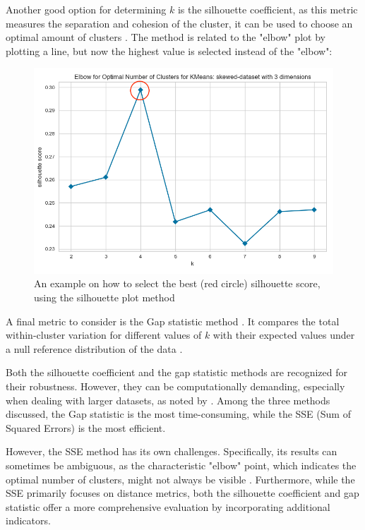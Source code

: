 Another good option for determining $k$ is the silhouette coefficient, as this metric measures the separation and cohesion of the cluster, it can be used to choose an optimal amount of clusters \citep{saputra_effect_2020}. The method is related to the "elbow" plot by plotting a line, but now the highest value is selected instead of the "elbow":
\begin{figure}
    \centering
    \includegraphics[width=0.75\linewidth]{skewed-dataset-3-kmeans.png}
    \caption{An example on how to select the best (red circle) silhouette score, using the silhouette plot method \citep{saputra_effect_2020}}
    \label{fig:k-select-silhouette}
\end{figure}
A final metric to consider is the Gap statistic method \citep{yuan_research_2019}.
It compares the total within-cluster variation for different values of $k$ with their expected values under a null reference distribution of the data \citep{tibshirani_estimating_2001}.

Both the silhouette coefficient and the gap statistic methods are recognized for their robustness. 
However, they can be computationally demanding, especially when dealing with larger datasets, as noted by \citep{yuan_research_2019}. 
Among the three methods discussed, the Gap statistic is the most time-consuming, while the SSE (Sum of Squared Errors) is the most efficient.

However, the SSE method has its own challenges. Specifically, its results can sometimes be ambiguous, as the characteristic "elbow" point, which indicates the optimal number of clusters, might not always be visible \citep{yuan_research_2019, kodinariya_review_2013}. 
Furthermore, while the SSE primarily focuses on distance metrics, both the silhouette coefficient and gap statistic offer a more comprehensive evaluation by incorporating additional indicators.

